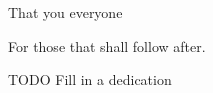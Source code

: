\documentclass[letterpaper,12pt]{article}
\begin{document}
\begin{acknowledgments}
That you everyone
\end{acknowledgments}
\newpage


\begin{dedication}
For those that shall follow after.

TODO Fill in a dedication
\end{dedication}
\newpage


\bodymatter

















\end{document}
